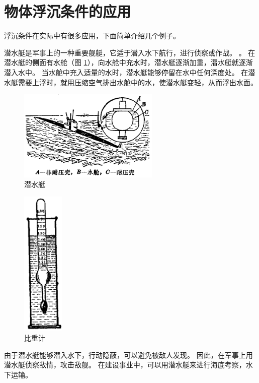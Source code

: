 \section{物体浮沉条件的应用}\label{sec:6-5}

浮沉条件在实际中有很多应用，下面简单介绍几个例子。

潜水艇是军事上的一种重要舰艇，它适于潜入水下航行，进行侦察或作战。
。
在潜水艇的侧面有水舱（图 \ref{fig:6-9}），向水舱中充水时，潜水艇逐渐加重，潜水艇就逐渐潜入水中。
当水舱中充入适量的水时，潜水艇能够停留在水中任何深度处。
在潜水艇需要上浮时，就用压缩空气排出水舱中的水，使潜水艇变轻，从而浮出水面。

\begin{figure}[htbp]
    \centering
    \includegraphics[width=0.6\textwidth]{../pic/czwl1-ch6-9}
    \caption{潜水艇}\label{fig:6-9}
\end{figure}

\begin{figure}
    \centering
    \includegraphics[width=2cm]{../pic/czwl1-ch6-10}
    \caption{比重计}\label{fig:6-10}
\end{figure}

由于潜水艇能够潜入水下，行动隐蔽，可以避免被敌人发现。
因此，在军事上用潜水艇侦察敌情，攻击敌舰。
在建设事业中，可以用潜水艇来进行海底考察，水下运输。

